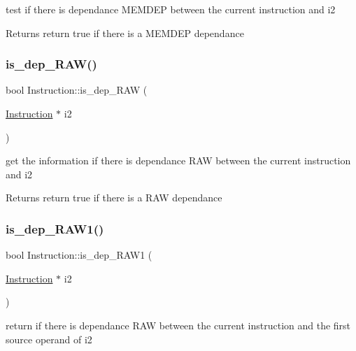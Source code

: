 test if there is dependance M\+E\+M\+D\+EP between the current instruction and i2 ~\newline
 

\begin{DoxyReturn}{Returns}
return true if there is a M\+E\+M\+D\+EP dependance 
\end{DoxyReturn}
\mbox{\label{class_instruction_a4c902c5a8fdc8c8841ec24f389605fd5}} 
\subsubsection{\texorpdfstring{is\+\_\+dep\+\_\+\+R\+A\+W()}{is\_dep\_RAW()}}
{\footnotesize\ttfamily bool Instruction\+::is\+\_\+dep\+\_\+\+R\+AW (\begin{DoxyParamCaption}\item[{\mbox{\hyperlink{class_instruction}{Instruction}} $\ast$}]{i2 }\end{DoxyParamCaption})}



get the information if there is dependance R\+AW between the current instruction and i2 ~\newline
 

\begin{DoxyReturn}{Returns}
return true if there is a R\+AW dependance 
\end{DoxyReturn}
\mbox{\label{class_instruction_ae5d54f535adab416c53eb0ff6a438804}} 
\subsubsection{\texorpdfstring{is\+\_\+dep\+\_\+\+R\+A\+W1()}{is\_dep\_RAW1()}}
{\footnotesize\ttfamily bool Instruction\+::is\+\_\+dep\+\_\+\+R\+A\+W1 (\begin{DoxyParamCaption}\item[{\mbox{\hyperlink{class_instruction}{Instruction}} $\ast$}]{i2 }\end{DoxyParamCaption})}



return if there is dependance R\+AW between the current instruction and the first source operand of i2 ~\newline
 

